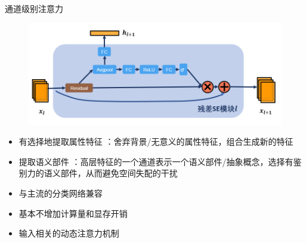 \documentclass[usenames,dvipsnames,notes]{beamer}
\newcommand{\liuhao}{\fontsize{7.875pt}{\baselineskip}\selectfont}  %
\begin{document}
\begin{frame}{通道级别注意力}
	\begin{figure}
		\centering
		\includegraphics[width=.7\textwidth]{fig/2018-05-11-16-53-10.png}
	\end{figure}
	\begin{itemize}
		\item 有选择地提取属性特征  {\liuhao：舍弃背景/无意义的属性特征，组合生成新的特征} 
		\item 提取语义部件 {\liuhao：高层特征的一个通道表示一个语义部件/抽象概念，选择有鉴别力的语义部件，从而避免空间失配的干扰} 
		\pause
		\item 与主流的分类网络兼容
		\item 基本不增加计算量和显存开销
		\item 输入相关的动态注意力机制
	\end{itemize}
\end{frame}
\end{document}
